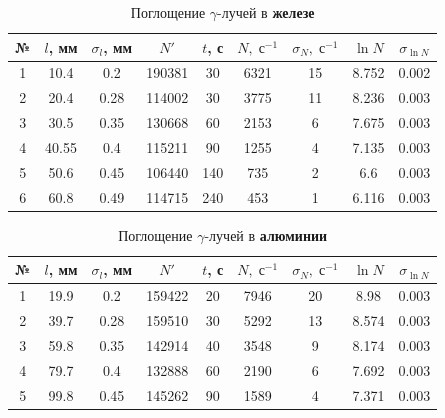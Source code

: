 \documentclass[12pt]{kiarticle}
\newcommand{\ga}{\ensuremath{\gamma}}
\begin{document}
\begin{table}[h!]
	\caption{Поглощение \ga-лучей в \textbf{железе}}
	\begin{center}
		\begin{tabular}{|c|c|c|c|c|c|c|c|c|}
			\hline
			№ & $ l $, мм & $ \sigma_l $, мм & $ N' $ & $ t $, с & $ N, \; с^{-1}$  & $ \sigma_N, \; с^{-1}$ & $ \ln N $ & $ \sigma_{\ln N} $ \\
			\hline
		1 & 10.4 & 0.2 & 190381 & 30 & 6321 & 15 & 8.752 & 0.002 \\
		2 & 20.4 & 0.28 & 114002 & 30 & 3775 & 11 & 8.236 & 0.003 \\
		3 & 30.5 & 0.35 & 130668 & 60 & 2153 & 6 & 7.675 & 0.003 \\
		4 & 40.55 & 0.4 & 115211 & 90 & 1255 & 4 & 7.135 & 0.003 \\
		5 & 50.6 & 0.45 & 106440 & 140 & 735 & 2 & 6.6 & 0.003 \\
		6 & 60.8 & 0.49 & 114715 & 240 & 453 & 1 & 6.116 & 0.003 \\
			\hline
		\end{tabular}
	\end{center}
	\label{table_2}
\end{table}

\begin{table}[h!]
	\caption{Поглощение \ga-лучей в \textbf{алюминии}}
	\begin{center}
		\begin{tabular}{|c|c|c|c|c|c|c|c|c|}
			\hline
			№ & $ l $, мм & $ \sigma_l $, мм & $ N' $ & $ t $, с & $ N, \; с^{-1}$  & $ \sigma_N, \; с^{-1}$ & $ \ln N $ & $ \sigma_{\ln N} $ \\
			\hline
			 1 & 19.9 & 0.2 & 159422 & 20 & 7946 & 20 & 8.98 & 0.003 \\
			2 & 39.7 & 0.28 & 159510 & 30 & 5292 & 13 & 8.574 & 0.003 \\
			3 & 59.8 & 0.35 & 142914 & 40 & 3548 & 9 & 8.174 & 0.003 \\
			4 & 79.7 & 0.4 & 132888 & 60 & 2190 & 6 & 7.692 & 0.003 \\
			5 & 99.8 & 0.45 & 145262 & 90 & 1589 & 4 & 7.371 & 0.003 \\
			\hline
		\end{tabular}
	\end{center}
	\label{table_3}
\end{table}
\end{document}
